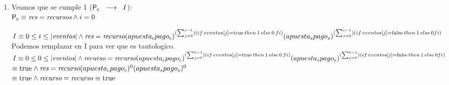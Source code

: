 \documentclass[10pt,a4paper]{article}
\begin{document}
    
    \begin{enumerate}
        \item Veamos que se cumple 1 ($\mathsf{P_{c}} \hspace{2mm} \longrightarrow \hspace{2mm} I$):\\


        $\mathsf{P_{c}} \equiv \textit{res} = \textit{recursos} \land i=0$
        
        $I \equiv 0 \leq i \leq |{\textit{eventos}}\vert \land \\
        \textit{res} = \textit{recurso}(\textit{$apuesta_{c}$}\textit{$pago_{c}$})^{(\sum_{j = 0}^{i -1})(if \hspace{0.5mm} eventos[j] = \mathrm{true} \hspace{0.5mm} then \hspace{0.5mm} 1 \hspace{0.5mm} else \hspace{0.5mm} 0 \hspace{0.5mm} fi)}
        (\textit{$apuesta_{s}$}\textit{$pago_{s}$})^{(\sum_{j = 0}^{i -1})(if \hspace{0.5mm} eventos[j] = \mathrm{false} \hspace{0.5mm} then  \hspace{0.5mm} 1  \hspace{0.5mm} else \hspace{0.5mm} 0 fi)}$\\
        
        Podemos remplazar \precondicion \hspace{0.5mm} en I para ver que es tautologico. \\

        $I \equiv 0 \leq 0 \leq |{\textit{eventos}}\vert \land \\
        \textit{recurso} = \textit{recurso}(\textit{$apuesta_{c}$}\textit{$pago_{c}$})^{(\sum_{j = 0}^{0 -1})(if \hspace{0.5mm} eventos[j] = \mathrm{true} \hspace{0.5mm} then \hspace{0.5mm} 1 \hspace{0.5mm} else \hspace{0.5mm} 0 \hspace{0.5mm} fi)}
        (\textit{$apuesta_{s}$}\textit{$pago_{s}$})^{(\sum_{j = 0}^{0 -1})(if \hspace{0.5mm} eventos[j] = \mathrm{false} \hspace{0.5mm} then  \hspace{0.5mm} 1  \hspace{0.5mm} else \hspace{0.5mm} 0 fi)}$\\
        $\equiv \mathrm{true} \land \textit{res} = \textit{recurso}(\textit{$apuesta_{c}$}\textit{$pago_{c}$})^{0}
        (\textit{$apuesta_{s}$}\textit{$pago_{s}$})^{0}$\\   
        $\equiv \mathrm{true} \land \textit{recurso} = \textit{recurso} \equiv \mathrm{true}$
        \\


\end{enumerate}
\end{document}

